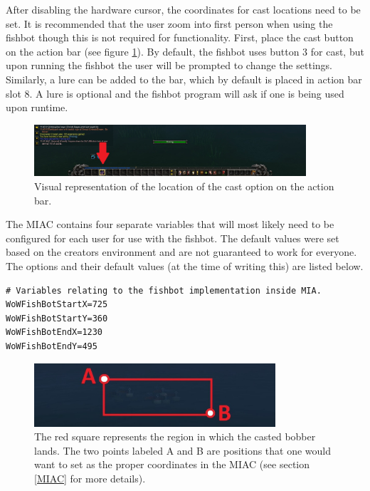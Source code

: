 After disabling the hardware cursor, the coordinates for cast locations need to be set. It is recommended that the user zoom into first person when using the fishbot though this is not required for functionality. First, place the cast button on the action bar (see figure \ref{cast bar}). By default, the fishbot uses button 3 for cast, but upon running the fishbot the user will be prompted to change the settings. Similarly, a lure can be added to the bar, which by default is placed in action bar slot 8. A lure is optional and the fishbot program will ask if one is being used upon runtime.

\begin{figure}[h]
	\centering
	\includegraphics[width=0.9\textwidth]{images/WoWScrnShot_040118_234212.jpg}
	\caption{Visual representation of the location of the cast option on the action bar.} \label{cast bar}
\end{figure}

The MIAC contains four separate variables that will most likely need to be configured for each user for use with the fishbot. The default values were set based on the creators environment and are not guaranteed to work for everyone. The options and their default values (at the time of writing this) are listed below.

\begin{lstlisting}
# Variables relating to the fishbot implementation inside MIA.
WoWFishBotStartX=725
WoWFishBotStartY=360
WoWFishBotEndX=1230
WoWFishBotEndY=495
\end{lstlisting}

\begin{figure}[h]
	\centering
	\includegraphics[width=0.8\textwidth]{images/WoWScrnShot_040118_234212b.jpg}
	\caption{The red square represents the region in which the casted bobber lands. The two points labeled A and B are positions that one would want to set as the proper coordinates in the MIAC (see section \ref{MIAC} for more details).} \label{fishbot square}
\end{figure}

